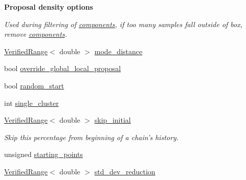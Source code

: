 \begin{Indent}{\bf Proposal density options}
\begin{DoxyCompactItemize}
\begin{DoxyCompactList}\small\item\em Used during filtering of \hyperlink{namespaceeos_1_1components}{components}, if too many samples fall outside of box, remove \hyperlink{namespaceeos_1_1components}{components}. \item\end{DoxyCompactList}\item 
\hyperlink{classeos_1_1VerifiedRange}{VerifiedRange}$<$ double $>$ \hyperlink{structeos_1_1PopulationMonteCarloSampler_1_1Config_abb5d4e207d1f2da439dddf9c49854a1e}{mode\_\-distance}
\item 
bool \hyperlink{structeos_1_1PopulationMonteCarloSampler_1_1Config_aee29a36e8e23c971ba1e36616e9affb4}{override\_\-global\_\-local\_\-proposal}
\item 
bool \hyperlink{structeos_1_1PopulationMonteCarloSampler_1_1Config_aca0e5339b634644471e1aa5cdd698231}{random\_\-start}
\item 
int \hyperlink{structeos_1_1PopulationMonteCarloSampler_1_1Config_a2a6f2098dc8be089015818326d8eb15f}{single\_\-cluster}
\item 
\hyperlink{classeos_1_1VerifiedRange}{VerifiedRange}$<$ double $>$ \hyperlink{structeos_1_1PopulationMonteCarloSampler_1_1Config_ac920d732b229713ca67428d284390fa2}{skip\_\-initial}
\begin{DoxyCompactList}\small\item\em Skip this percentage from beginning of a chain's history. \item\end{DoxyCompactList}\item 
unsigned \hyperlink{structeos_1_1PopulationMonteCarloSampler_1_1Config_a235c1a2d0c336f9f8ed9c58917acf68b}{starting\_\-points}
\item 
\hyperlink{classeos_1_1VerifiedRange}{VerifiedRange}$<$ double $>$ \hyperlink{structeos_1_1PopulationMonteCarloSampler_1_1Config_a9de01b257ce34b8a747de5dcf992e053}{std\_\-dev\_\-reduction}
\end{DoxyCompactItemize}
\end{Indent}
